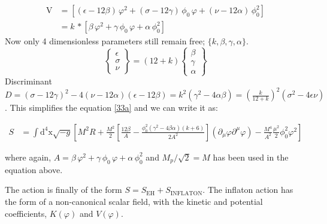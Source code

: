 \documentclass[aps,prd,reprint,preprintnumbers,showpacs,floatfix,nofootinbib,superscript address]{revtex4-2}
\begin{document}
\[
\begin{split}
\text{V} &= \left[(\epsilon - 12\beta)\,\varphi^2 + (\sigma - 12\gamma)\,\phi_0\,\varphi + (\nu - 12\alpha)\,\phi_0^2\right] \\
         &= k\,*\left[\beta\,\varphi^2 + \gamma\,\phi_0\,\varphi + \alpha\,\phi_0^2\right]
\end{split}
\]
Now only 4 dimensionless parameters still remain free; $\{k, \beta, \gamma, \alpha \}$.
\begin{equation}
    \begin{Bmatrix}
        \epsilon \\ \sigma \\ \nu 
    \end{Bmatrix}
    = (12+k)
    \begin{Bmatrix}
        \beta \\ \gamma \\ \alpha
    \end{Bmatrix}
\end{equation}
Discriminant $D = (\sigma -12 \gamma )^2-4 (\nu -12 \alpha ) (\epsilon -12 \beta ) = k^2 (\gamma^2 - 4\alpha \beta) = (\frac{k}{12+k})^2 (\sigma^2 -4 \epsilon \nu)$. This simplifies the equation \ref{33a} and we can write it as:
\begin{widetext}
    \begin{equation} 
    \begin{aligned}
        S &= \int \text{d}^4\text{x} \sqrt{-g} [ M^2 R + \frac{M^2}{2} \left[\frac{12 \beta}{A} - \frac{\phi_0^2 (\gamma^2 - 4\beta\alpha)(k+6) }{2 A^2}\right] (\partial_\mu \varphi \partial^\mu \varphi) -  \frac{M^4}{A^2} \frac{\mu^2}{2} \phi^2_0 \varphi^2 ] 
    \end{aligned}
\end{equation}
\end{widetext}
where again, $A =\beta\,\varphi^2 + \gamma\,\phi_0\,\varphi + \alpha\,\phi_0^2$ and $M_p/\sqrt{2} = M$ has been used in the equation above.

The action is finally of the form $S = S_{\text{EH}} + S_{\text{INFLATON}}$. The inflaton action has the form of a non-canonical scalar field, with the kinetic and potential coefficients, $K(\varphi)$ and $V(\varphi)$.
\end{document}
